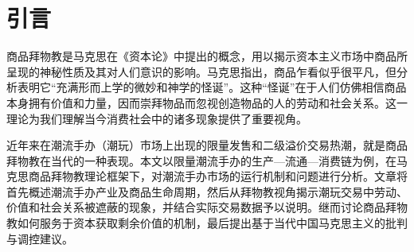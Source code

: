 
\chapter{引言}
商品拜物教是马克思在《资本论》中提出的概念，用以揭示资本主义市场中商品所呈现的神秘性质及其对人们意识的影响\cite{dekaer.makesi2012zibenlun}。马克思指出，商品乍看似乎很平凡，但分析表明它“充满形而上学的微妙和神学的怪诞”。这种“怪诞”在于人们仿佛相信商品本身拥有价值和力量，因而崇拜物品而忽视创造物品的人的劳动和社会关系\cite{song2024guan}。这一理论为我们理解当今消费社会中的诸多现象提供了重要视角。

近年来在潮流手办（潮玩）市场上出现的限量发售和二级溢价交易热潮，就是商品拜物教在当代的一种表现\cite{WJXB202502001,XJZS202406003}。本文以限量潮流手办的生产—流通—消费链为例，在马克思商品拜物教理论框架下，对潮流手办市场的运行机制和问题进行分析。文章将首先概述潮流手办产业及商品生命周期，然后从拜物教视角揭示潮玩交易中劳动、价值和社会关系被遮蔽的现象，并结合实际交易数据予以说明。继而讨论商品拜物教如何服务于资本获取剩余价值的机制，最后提出基于当代中国马克思主义的批判与调控建议。